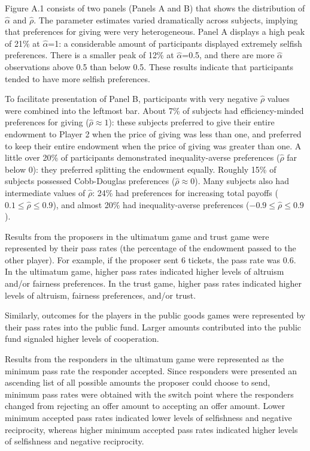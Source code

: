 \documentclass[12pt]{article}
\begin{document}
Figure A.1 consists of two panels (Panels A and B) that shows the distribution of  \(\hat{\alpha}\) and \(\hat{\rho}\). The parameter estimates varied dramatically across subjects, implying that preferences for giving were very heterogeneous. Panel A displays a high peak of 21\% at \(\hat{\alpha}\)=1: a considerable amount of participants displayed extremely selfish preferences. There is a smaller peak of 12\% at \(\hat{\alpha}\)=0.5, and there are more \(\hat{\alpha}\) observations above 0.5 than below 0.5. These results indicate that participants tended to have more selfish preferences. 

To facilitate presentation of Panel B, participants with very negative \(\hat{\rho}\) values were combined into the leftmost bar. About 7\% of subjects had efficiency-minded preferences for giving (\(\hat{\rho} \approx 1\)): these subjects preferred to give their entire endowment to Player 2 when the price of giving was less than one, and preferred to keep their entire endowment when the price of giving was greater than one. A little over 20\% of participants demonstrated inequality-averse preferences (\(\hat{\rho}\) far below 0): they preferred splitting the endowment equally. Roughly 15\% of subjects possessed Cobb-Douglas preferences (\(\hat{\rho} \approx 0\)). Many subjects also had intermediate values of \(\hat{\rho}\): 24\% had preferences for increasing total payoffs (\(0.1 \leq \hat{\rho} \leq 0.9\)), and almost 20\% had inequality-averse preferences (\(-0.9 \leq \hat{\rho} \leq 0.9\)).

Results from the proposers in the ultimatum game and trust game were represented by their pass rates (the percentage of the endowment passed to the other player). For example, if the proposer sent 6 tickets, the pass rate was 0.6. In the ultimatum game, higher pass rates indicated higher levels of altruism and/or fairness preferences. In the trust game, higher pass rates indicated higher levels of altruism, fairness preferences, and/or trust. 

Similarly, outcomes for the players in the public goods games were represented by their pass rates into the public fund. Larger amounts contributed into the public fund signaled higher levels of cooperation.

Results from the responders in the ultimatum game were represented as the minimum pass rate the responder accepted. Since responders were presented an ascending list of all possible amounts the proposer could choose to send, minimum pass rates were obtained with the switch point where the responders changed from rejecting an offer amount to accepting an offer amount. Lower minimum accepted pass rates indicated lower levels of selfishness and negative reciprocity, whereas higher minimum accepted pass rates indicated higher levels of selfishness and negative reciprocity.
\end{document}
